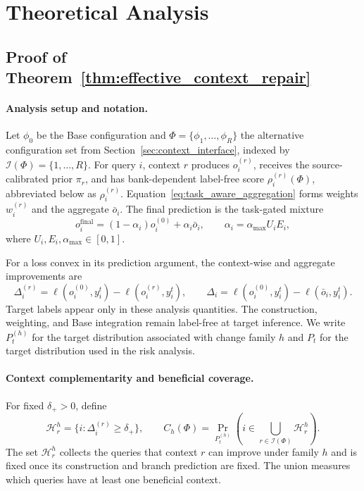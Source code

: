 \section{Theoretical Analysis}
\label{app:theory}

\subsection{Proof of Theorem~\ref{thm:effective_context_repair}}
\label{app:theorem-proof}

\paragraph{Analysis setup and notation.}
\label{app:analysis-setup}

Let $\phi_0$ be the Base configuration and
$\Phi=\{\phi_1,\ldots,\phi_R\}$ the alternative configuration set from
Section~\ref{sec:context_interface}, indexed by
$\mathcal I(\Phi)=\{1,\ldots,R\}$. For query $i$, context $r$ produces $o_i^{(r)}$, receives
the source-calibrated prior $\pi_r$, and has bank-dependent label-free score
$\rho_i^{(r)}(\Phi)$, abbreviated below as $\rho_i^{(r)}$.
Equation~\eqref{eq:task_aware_aggregation} forms
weights $w_i^{(r)}$ and the aggregate $\bar o_i$.  The final prediction is
the task-gated mixture
\[
o_i^{\mathrm{final}}=(1-\alpha_i)o_i^{(0)}+\alpha_i\bar o_i,
\qquad
\alpha_i=\alpha_{\max}U_iE_i,
\]
where $U_i,E_i,\alpha_{\max}\in[0,1]$.

For a loss convex in its prediction argument, the context-wise and aggregate
improvements are
\[
\Delta_i^{(r)}
=\ell(o_i^{(0)},y_i^t)-\ell(o_i^{(r)},y_i^t),
\qquad
\Delta_i
=\ell(o_i^{(0)},y_i^t)-\ell(\bar o_i,y_i^t).
\]
Target labels appear only in these analysis quantities.  The construction,
weighting, and Base integration remain label-free at target inference.  We
write $P_t^{(h)}$ for the target distribution associated with change family
$h$ and $P_t$ for the target distribution used in the risk analysis.

\paragraph{Context complementarity and beneficial coverage.}
\label{app:repair-coverage}

For fixed $\delta_+>0$, define
\begin{equation}
\mathcal H_r^h
=\{i:\Delta_i^{(r)}\geq\delta_+\},
\qquad
C_h(\Phi)
  =\Pr_{P_t^{(h)}}\!\left(i\in\bigcup_{r\in\mathcal I(\Phi)}\mathcal H_r^h\right).
\label{eq:potential_repair_coverage}
\end{equation}
The set $\mathcal H_r^h$ collects the queries that context $r$ can improve
under family $h$ and is fixed once its construction and branch prediction are
fixed.  The union measures which queries have at least one beneficial context.

